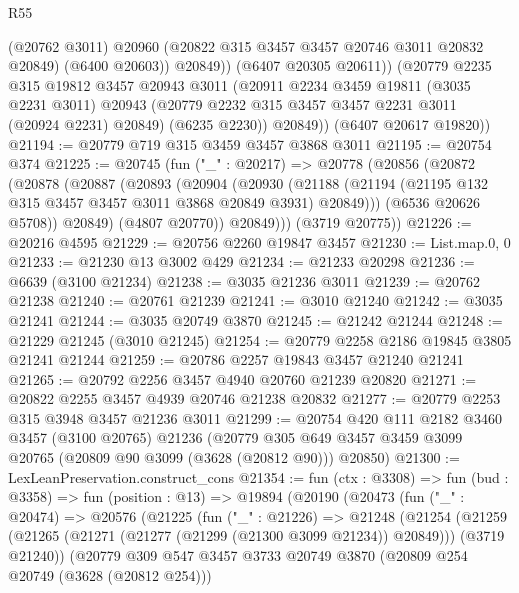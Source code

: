 \begin{lexlean}{R55}
\begin{coremodule}
                (@20762 @3011)
                @20960
                (@20822 @315 @3457 @3457 @20746 @3011 @20832 @20849)
                (@6400 @20603))
              @20849))
          (@6407 @20305 @20611))
        (@20779
          @2235
          @315
          @19812
          @3457
          @20943
          @3011
          (@20911
            @2234
            @3459
            @19811
            (@3035 @2231 @3011)
            @20943
            (@20779 @2232 @315 @3457 @3457 @2231 @3011 (@20924 @2231) @20849)
            (@6235 @2230))
          @20849))
      (@6407 @20617 @19820))
@21194 := @20779 @719 @315 @3459 @3457 @3868 @3011
@21195 := @20754 @374
@21225 := @20745
    (fun ("_" : @20217) =>
    @20778
      (@20856
        (@20872
          (@20878
            (@20887
              (@20893
                (@20904
                  (@20930
                    (@21188
                      (@21194 (@21195 @132 @315 @3457 @3457 @3011 @3868 @20849 @3931) @20849)))
                  (@6536 @20626 @5708))
                @20849)
              (@4807 @20770))
            @20849)))
      (@3719 @20775))
@21226 := @20216 @4595
@21229 := @20756 @2260 @19847 @3457
@21230 := List.map.{0, 0}
@21233 := @21230 @13 @3002 @429
@21234 := @21233 @20298
@21236 := @6639 (@3100 @21234)
@21238 := @3035 @21236 @3011
@21239 := @20762 @21238
@21240 := @20761 @21239
@21241 := @3010 @21240
@21242 := @3035 @21241
@21244 := @3035 @20749 @3870
@21245 := @21242 @21244
@21248 := @21229 @21245 (@3010 @21245)
@21254 := @20779 @2258 @2186 @19845 @3805 @21241 @21244
@21259 := @20786 @2257 @19843 @3457 @21240 @21241
@21265 := @20792 @2256 @3457 @4940 @20760 @21239 @20820
@21271 := @20822 @2255 @3457 @4939 @20746 @21238 @20832
@21277 := @20779 @2253 @315 @3948 @3457 @21236 @3011
@21299 := @20754
    @420
    @111
    @2182
    @3460
    @3457
    (@3100 @20765)
    @21236
    (@20779 @305 @649 @3457 @3459 @3099 @20765 (@20809 @90 @3099 (@3628 (@20812 @90))) @20850)
@21300 := LexLeanPreservation.construct_cons
@21354 := fun (ctx : @3308) =>
  fun (bud : @3358) =>
  fun (position : @13) =>
  @19894
    (@20190
      (@20473
        (fun ("_" : @20474) =>
        @20576
          (@21225
            (fun ("_" : @21226) =>
            @21248
              (@21254
                (@21259
                  (@21265 (@21271 (@21277 (@21299 (@21300 @3099 @21234)) @20849)))
                  (@3719 @21240))
                (@20779
                  @309
                  @547
                  @3457
                  @3733
                  @20749
                  @3870
                  (@20809 @254 @20749 (@3628 (@20812 @254)))

\end{coremodule}
\end{lexlean}
